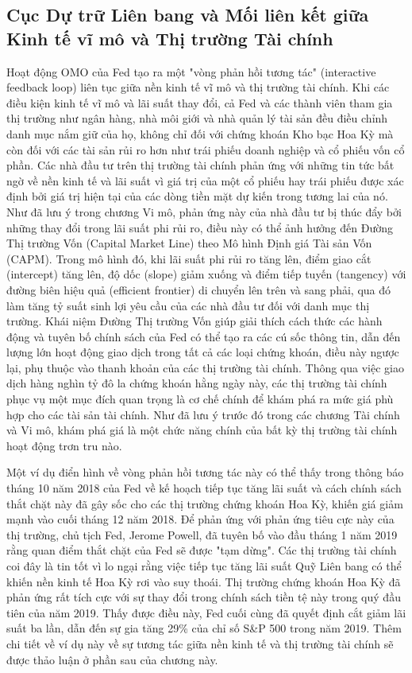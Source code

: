 \subsection{Cục Dự trữ Liên bang và Mối liên kết giữa Kinh tế vĩ mô và Thị trường Tài chính}

Hoạt động OMO của Fed tạo ra một "vòng phản hồi tương tác" (interactive feedback loop) liên tục giữa nền kinh tế vĩ mô và thị trường tài chính. Khi các điều kiện kinh tế vĩ mô và lãi suất thay đổi, cả Fed và các thành viên tham gia thị trường như ngân hàng, nhà môi giới và nhà quản lý tài sản đều điều chỉnh danh mục nắm giữ của họ, không chỉ đối với chứng khoán Kho bạc Hoa Kỳ mà còn đối với các tài sản rủi ro hơn như trái phiếu doanh nghiệp và cổ phiếu vốn cổ phần. Các nhà đầu tư trên thị trường tài chính phản ứng với những tin tức bất ngờ về nền kinh tế và lãi suất vì giá trị của một cổ phiếu hay trái phiếu được xác định bởi giá trị hiện tại của các dòng tiền mặt dự kiến trong tương lai của nó. Như đã lưu ý trong chương Vi mô, phản ứng này của nhà đầu tư bị thúc đẩy bởi những thay đổi trong lãi suất phi rủi ro, điều này có thể ảnh hưởng đến Đường Thị trường Vốn (Capital Market Line) theo Mô hình Định giá Tài sản Vốn (CAPM). Trong mô hình đó, khi lãi suất phi rủi ro tăng lên, điểm giao cắt (intercept) tăng lên, độ dốc (slope) giảm xuống và điểm tiếp tuyến (tangency) với đường biên hiệu quả (efficient frontier) di chuyển lên trên và sang phải, qua đó làm tăng tỷ suất sinh lợi yêu cầu của các nhà đầu tư đối với danh mục thị trường. Khái niệm Đường Thị trường Vốn giúp giải thích cách thức các hành động và tuyên bố chính sách của Fed có thể tạo ra các cú sốc thông tin, dẫn đến lượng lớn hoạt động giao dịch trong tất cả các loại chứng khoán, điều này ngược lại, phụ thuộc vào thanh khoản của các thị trường tài chính. Thông qua việc giao dịch hàng nghìn tỷ đô la chứng khoán hằng ngày này, các thị trường tài chính phục vụ một mục đích quan trọng là cơ chế chính để khám phá ra mức giá phù hợp cho các tài sản tài chính. Như đã lưu ý trước đó trong các chương Tài chính và Vi mô, khám phá giá là một chức năng chính của bất kỳ thị trường tài chính hoạt động trơn tru nào.

Một ví dụ điển hình về vòng phản hồi tương tác này có thể thấy trong thông báo tháng 10 năm 2018 của Fed về kế hoạch tiếp tục tăng lãi suất và cách chính sách thắt chặt này đã gây sốc cho các thị trường chứng khoán Hoa Kỳ, khiến giá giảm mạnh vào cuối tháng 12 năm 2018. Để phản ứng với phản ứng tiêu cực này của thị trường, chủ tịch Fed, Jerome Powell, đã tuyên bố vào đầu tháng 1 năm 2019 rằng quan điểm thắt chặt của Fed sẽ được "tạm dừng". Các thị trường tài chính coi đây là tin tốt vì lo ngại rằng việc tiếp tục tăng lãi suất Quỹ Liên bang có thể khiến nền kinh tế Hoa Kỳ rơi vào suy thoái. Thị trường chứng khoán Hoa Kỳ đã phản ứng rất tích cực với sự thay đổi trong chính sách tiền tệ này trong quý đầu tiên của năm 2019. Thấy được điều này, Fed cuối cùng đã quyết định cắt giảm lãi suất ba lần, dẫn đến sự gia tăng 29\% của chỉ số S\&P 500 trong năm 2019. Thêm chi tiết về ví dụ này về sự tương tác giữa nền kinh tế và thị trường tài chính sẽ được thảo luận ở phần sau của chương này.

